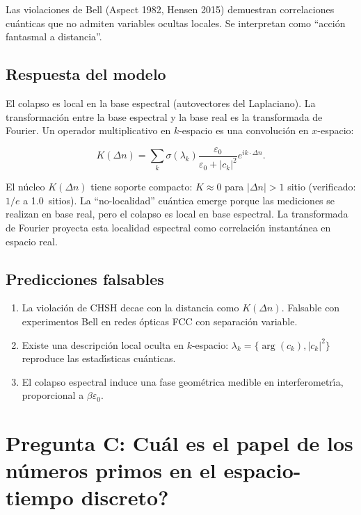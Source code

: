 \documentclass[twocolumn]{article}
\begin{document}
Las violaciones de Bell (Aspect 1982, Hensen 2015) demuestran
correlaciones cu\'anticas que no admiten variables ocultas locales.
Se interpretan como ``acci\'on fantasmal a distancia''.

\subsection{Respuesta del modelo}

El colapso es local en la base espectral (autovectores del
Laplaciano). La transformaci\'on entre la base espectral y la base
real es la transformada de Fourier. Un operador multiplicativo en
$k$-espacio es una convoluci\'on en $x$-espacio:

\begin{equation}
  K(\Delta n) = \sum_k \sigma(\lambda_k)
    \frac{\varepsilon_0}{\varepsilon_0+|c_k|^2}
    e^{i k\cdot\Delta n}.
\end{equation}

El n\'ucleo $K(\Delta n)$ tiene soporte compacto: $K\approx0$ para
$|\Delta n| > 1$ sitio (verificado: $1/e$ a 1.0~sitios). La
``no-localidad'' cu\'antica emerge porque las mediciones se
realizan en base real, pero el colapso es local en base espectral.
La transformada de Fourier proyecta esta localidad espectral como
correlaci\'on instant\'anea en espacio real.

\subsection{Predicciones falsables}

\begin{enumerate}
  \item[B1.] La violaci\'on de CHSH decae con la distancia como
    $K(\Delta n)$. Falsable con experimentos Bell en redes \'opticas
    FCC con separaci\'on variable.
  \item[B2.] Existe una descripci\'on local oculta en $k$-espacio:
    $\lambda_k = \{\arg(c_k), |c_k|^2\}$ reproduce las estad\'{\i}sticas
    cu\'anticas.
  \item[B3.] El colapso espectral induce una fase geom\'etrica
    medible en interferometr\'{\i}a, proporcional a $\beta\varepsilon_0$.
\end{enumerate}

\section{Pregunta C: \textquestiondown Cu\'al es el papel de los
  n\'umeros primos en el espacio-tiempo discreto?}
\end{document}
